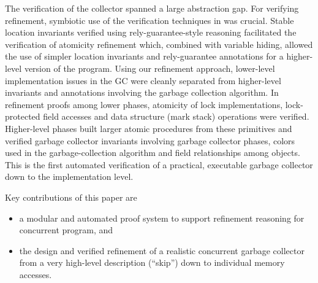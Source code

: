 The verification of the collector spanned a large abstraction gap. For verifying refinement, symbiotic use of the verification techniques in \civl was crucial. Stable location invariants verified using rely-guarantee-style reasoning facilitated the verification of atomicity refinement which, combined with variable hiding, allowed the use of simpler location invariants and rely-guarantee annotations for a higher-level version of the program.
Using our refinement approach, lower-level implementation issues in the GC were cleanly separated from higher-level invariants and annotations involving the garbage collection algorithm. In refinement proofs among lower phases, atomicity of lock implementations, lock-protected field accesses and data structure (mark stack) operations were verified. Higher-level phases built larger atomic procedures from these primitives and verified garbage collector invariants involving garbage collector phases, colors used in the garbage-collection algorithm and field relationships among objects.  This is the first automated verification of a practical, executable garbage collector down to the implementation level.


Key contributions of this paper are 
\begin{itemize}
\item a modular and automated proof system to support refinement reasoning for concurrent program, and 
\item the design and verified refinement of a realistic concurrent garbage collector from a very high-level description (``skip'') down to individual memory accesses.
\end{itemize}



